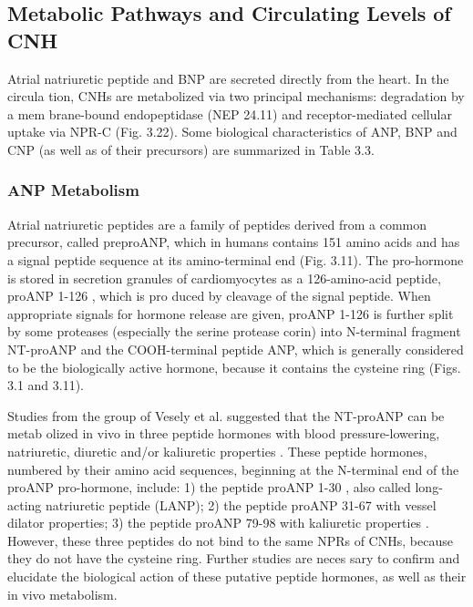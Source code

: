\documentclass[14pt,a4paper,onecolumn]{extarticle}
\begin{document}
\subsection{Metabolic Pathways and Circulating Levels of CNH
}
Atrial natriuretic peptide and BNP are secreted directly from the heart. In the circula tion, CNHs are metabolized via two principal mechanisms: degradation by a mem brane-bound endopeptidase (NEP 24.11) and receptor-mediated cellular uptake via NPR-C \citep{14} (Fig. 3.22). Some biological characteristics of ANP, BNP and CNP (as well as of their precursors) are summarized in Table 3.3.

\subsubsection{ANP Metabolism
}
Atrial natriuretic peptides are a family of peptides derived from a common precursor, called preproANP, which in humans contains 151 amino acids and has a signal peptide sequence at its amino-terminal end (Fig. 3.11). The pro-hormone is stored in secretion granules of cardiomyocytes as a 126-amino-acid peptide, proANP 1-126 , which is pro duced by cleavage of the signal peptide. When appropriate signals for hormone release are given, proANP 1-126 is further split by some proteases (especially the serine protease corin) \citep{192} into N-terminal fragment NT-proANP and the COOH-terminal peptide ANP, which is generally considered to be the biologically active hormone, because it contains the cysteine ring (Figs. 3.1 and 3.11).

Studies from the group of Vesely et al. suggested that the NT-proANP can be metab olized in vivo in three peptide hormones with blood pressure-lowering, natriuretic, diuretic and/or kaliuretic properties \citep{100}. These peptide hormones, numbered by their amino acid sequences, beginning at the N-terminal end of the proANP pro-hormone, include: 1) the peptide proANP 1-30 , also called long-acting natriuretic peptide (LANP); 2) the peptide proANP 31-67 with vessel dilator properties; 3) the peptide proANP 79-98 with kaliuretic properties \citep{98}. However, these three peptides do not bind to the same NPRs of CNHs, because they do not have the cysteine ring. Further studies are neces sary to confirm and elucidate the biological action of these putative peptide hormones, as well as their in vivo metabolism.
\end{document}
